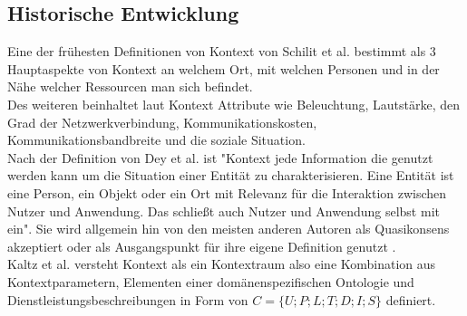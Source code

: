 \subsection{Historische Entwicklung}
Eine der frühesten Definitionen von Kontext von Schilit et al.\cite{schilit_context-aware_1994} bestimmt als 3 Hauptaspekte von Kontext an welchem Ort, mit welchen Personen und in der Nähe welcher Ressourcen man sich befindet.\\
Des weiteren beinhaltet laut  \cite{schilit_context-aware_1994} Kontext Attribute wie Beleuchtung, Lautstärke, den Grad der Netzwerkverbindung, Kommunikationskosten, Kommunikationsbandbreite und die soziale Situation.\\
Nach der Definition von Dey et al. \cite{dey_understanding_2001} ist "Kontext jede Information die genutzt werden kann um die Situation einer Entität zu charakterisieren. Eine Entität ist eine Person, ein Objekt oder ein Ort mit Relevanz für die Interaktion zwischen Nutzer und Anwendung. Das schließt auch Nutzer und Anwendung selbst mit ein".
Sie wird allgemein hin von den meisten anderen Autoren als Quasikonsens akzeptiert \cite{wei_liu_survey_2011,alegre_engineering_2016,aguilar_cameonto_2018} oder als Ausgangspunkt für ihre eigene Definition genutzt \cite{kokinov_operational_2007,kayes_icaf_2012}.\\
Kaltz et al. \cite{wolfgang_kaltz_context-aware_2005} versteht Kontext als ein Kontextraum also eine Kombination aus Kontextparametern, Elementen einer domänenspezifischen Ontologie %
und Dienstleistungsbeschreibungen in Form von $C = \{U;P;L;T;D;I;S\}$ definiert.
